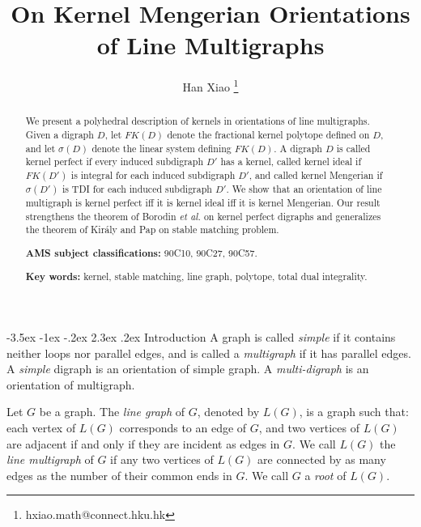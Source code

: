 \documentclass[11pt]{article}
\title{{\Large\bf  On Kernel Mengerian Orientations of Line Multigraphs}}
\date{}
\author{Han Xiao \footnote{hxiao.math@connect.hku.hk}}
\affil{Department of Mathematics,

The University of Hong Kong,

Hong Kong, China
}
\makeatletter
\numberwithin{theorem}{section}
\renewcommand\section{%
  \@startsection{section}{1}
                {\z@}%
                {-3.5ex \@plus -1ex \@minus -.2ex}%
                {2.3ex \@plus.2ex}%
                {\large\bfseries}%
}
\makeatother
\begin{document}

\maketitle

\jot

\hfill

\begin{abstract}
We present a polyhedral description of kernels in orientations of line multigraphs.
Given a digraph $D$, let $FK(D)$ denote the fractional kernel polytope defined on $D$,
and let $\sigma(D)$ denote the linear system defining $FK(D)$.
A digraph $D$ is
called kernel perfect if every induced subdigraph $D'$ has a kernel,
called kernel ideal if $FK(D')$ is integral for each induced subdigraph $D'$,
and called kernel Mengerian if $\sigma(D')$ is TDI for each induced subdigraph $D'$.
We show that an orientation of line multigraph is kernel perfect iff it is kernel ideal iff it is kernel Mengerian.
Our result strengthens the theorem of Borodin \textit{et al.} \cite{BoroKost98} on kernel perfect digraphs and generalizes the theorem of Kir\'{a}ly and Pap \cite{KiraPap08} on stable matching problem.

\hfill

\hfill

\noindent\textbf{AMS subject classifications:} 90C10, 90C27, 90C57.


\noindent\textbf{Key words:} kernel, stable matching, line graph, polytope, total dual integrality.
\end{abstract}


\newpage
\section{Introduction}
\label{intro}
A graph is called \textit{simple} if it contains neither loops nor parallel edges, and is called a \textit{multigraph} if it has parallel edges.
A \textit{simple} digraph is an orientation of simple graph.
A \textit{multi-digraph} is an orientation of multigraph.

Let $G$ be a graph.
The \textit{line graph} of $G$, denoted by $L(G)$, is a graph such that: each vertex of $L(G)$ corresponds to an edge of $G$, and two vertices of $L(G)$ are adjacent if and only if they are incident as edges in $G$.
We call $L(G)$ the \textit{line multigraph} of $G$ if any two vertices of $L(G)$ are connected by as many edges as the number of their common ends in $G$.
We call $G$ a \textit{root} of $L(G)$.
\end{document}

